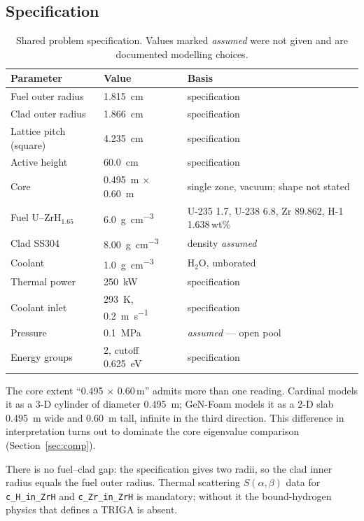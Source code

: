 \documentclass[11pt,a4paper]{article}
\begin{document}
\subsection{Specification}
\begin{table}[H]\centering\small
\caption{Shared problem specification. Values marked \emph{assumed} were not given and are
documented modelling choices.}
\begin{tabular}{@{}llp{62mm}@{}}
\toprule
\textbf{Parameter} & \textbf{Value} & \textbf{Basis}\\
\midrule
Fuel outer radius & \SI{1.815}{\centi\meter} & specification\\
Clad outer radius & \SI{1.866}{\centi\meter} & specification\\
Lattice pitch (square) & \SI{4.235}{\centi\meter} & specification\\
Active height & \SI{60.0}{\centi\meter} & specification\\
Core & \SI{0.495}{\meter} $\times$ \SI{0.60}{\meter} & single zone, vacuum; shape not stated\\
\midrule
Fuel U--ZrH$_{1.65}$ & \SI{6.0}{\gram\per\cubic\centi\meter} &
  U-235 1.7, U-238 6.8, Zr 89.862, H-1 1.638\,wt\%\\
Clad SS304 & \SI{8.00}{\gram\per\cubic\centi\meter} & density \emph{assumed}\\
Coolant & \SI{1.0}{\gram\per\cubic\centi\meter} & H$_2$O, unborated\\
\midrule
Thermal power & \SI{250}{\kilo\watt} & specification\\
Coolant inlet & \SI{293}{\kelvin}, \SI{0.2}{\meter\per\second} & specification\\
Pressure & \SI{0.1}{\mega\pascal} & \emph{assumed} --- open pool\\
Energy groups & 2, cutoff \SI{0.625}{\electronvolt} & specification\\
\bottomrule
\end{tabular}
\end{table}

The core extent ``0.495 $\times$ 0.60\,m'' admits more than one reading. Cardinal models it as
a 3-D cylinder of diameter \SI{0.495}{\meter}; GeN-Foam models it as a 2-D slab
\SI{0.495}{\meter} wide and \SI{0.60}{\meter} tall, infinite in the third direction. This
difference in interpretation turns out to dominate the core eigenvalue comparison
(Section~\ref{sec:comp}).

There is no fuel--clad gap: the specification gives two radii, so the clad inner radius
equals the fuel outer radius. Thermal scattering $S(\alpha,\beta)$ data for
\texttt{c\_H\_in\_ZrH} and \texttt{c\_Zr\_in\_ZrH} is mandatory; without it the
bound-hydrogen physics that defines a TRIGA is absent.
\end{document}
